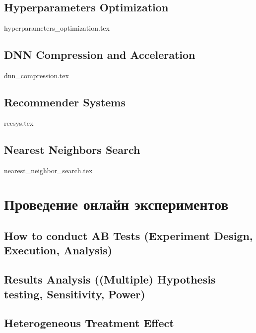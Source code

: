 \documentclass[openany,12pt]{book}
\numberwithin{equation}{section}
\begin{document}
\chapter{Hyperparameters Optimization}
{hyperparameters_optimization.tex}

\chapter{DNN Compression and Acceleration}
{dnn_compression.tex}

\chapter{Recommender Systems}
{recsys.tex}

\chapter{Nearest Neighbors Search}
{nearest_neighbor_search.tex}

\part{Проведение онлайн экспериментов}
\chapter{How to conduct AB Tests (Experiment Design, Execution, Analysis)}

\chapter{Results Analysis ((Multiple) Hypothesis testing, Sensitivity, Power)}

\chapter{Heterogeneous Treatment Effect}


% 
% 

\end{document}
